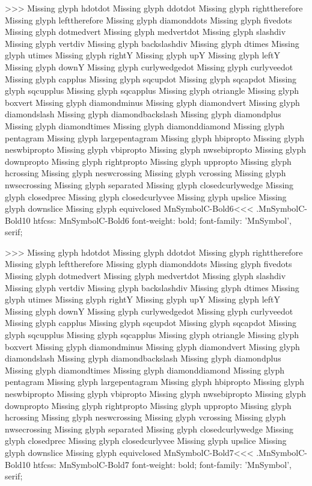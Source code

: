>>>
Missing glyph	hdotdot
Missing glyph	ddotdot
Missing glyph	righttherefore
Missing glyph	lefttherefore
Missing glyph	diamonddots
Missing glyph	fivedots
Missing glyph	dotmedvert
Missing glyph	medvertdot
Missing glyph	slashdiv
Missing glyph	vertdiv
Missing glyph	backslashdiv
Missing glyph	dtimes
Missing glyph	utimes
Missing glyph	rightY
Missing glyph	upY
Missing glyph	leftY
Missing glyph	downY
Missing glyph	curlywedgedot
Missing glyph	curlyveedot
Missing glyph	capplus
Missing glyph	sqcupdot
Missing glyph	sqcapdot
Missing glyph	sqcupplus
Missing glyph	sqcapplus
Missing glyph	otriangle
Missing glyph	boxvert
Missing glyph	diamondminus
Missing glyph	diamondvert
Missing glyph	diamondslash
Missing glyph	diamondbackslash
Missing glyph	diamondplus
Missing glyph	diamondtimes
Missing glyph	diamonddiamond
Missing glyph	pentagram
Missing glyph	largepentagram
Missing glyph	hbipropto
Missing glyph	neswbipropto
Missing glyph	vbipropto
Missing glyph	nwsebipropto
Missing glyph	downpropto
Missing glyph	rightpropto
Missing glyph	uppropto
Missing glyph	hcrossing
Missing glyph	neswcrossing
Missing glyph	vcrossing
Missing glyph	nwsecrossing
Missing glyph	separated
Missing glyph	closedcurlywedge
Missing glyph	closedprec
Missing glyph	closedcurlyvee
Missing glyph	upslice
Missing glyph	downslice
Missing glyph	equivclosed
\<MnSymbolC-Bold6\><<<
.MnSymbolC-Bold10
htfcss:  MnSymbolC-Bold6  font-weight: bold; font-family: 'MnSymbol', serif;

>>>
Missing glyph	hdotdot
Missing glyph	ddotdot
Missing glyph	righttherefore
Missing glyph	lefttherefore
Missing glyph	diamonddots
Missing glyph	fivedots
Missing glyph	dotmedvert
Missing glyph	medvertdot
Missing glyph	slashdiv
Missing glyph	vertdiv
Missing glyph	backslashdiv
Missing glyph	dtimes
Missing glyph	utimes
Missing glyph	rightY
Missing glyph	upY
Missing glyph	leftY
Missing glyph	downY
Missing glyph	curlywedgedot
Missing glyph	curlyveedot
Missing glyph	capplus
Missing glyph	sqcupdot
Missing glyph	sqcapdot
Missing glyph	sqcupplus
Missing glyph	sqcapplus
Missing glyph	otriangle
Missing glyph	boxvert
Missing glyph	diamondminus
Missing glyph	diamondvert
Missing glyph	diamondslash
Missing glyph	diamondbackslash
Missing glyph	diamondplus
Missing glyph	diamondtimes
Missing glyph	diamonddiamond
Missing glyph	pentagram
Missing glyph	largepentagram
Missing glyph	hbipropto
Missing glyph	neswbipropto
Missing glyph	vbipropto
Missing glyph	nwsebipropto
Missing glyph	downpropto
Missing glyph	rightpropto
Missing glyph	uppropto
Missing glyph	hcrossing
Missing glyph	neswcrossing
Missing glyph	vcrossing
Missing glyph	nwsecrossing
Missing glyph	separated
Missing glyph	closedcurlywedge
Missing glyph	closedprec
Missing glyph	closedcurlyvee
Missing glyph	upslice
Missing glyph	downslice
Missing glyph	equivclosed
\<MnSymbolC-Bold7\><<<
.MnSymbolC-Bold10
htfcss:  MnSymbolC-Bold7  font-weight: bold; font-family: 'MnSymbol', serif;

